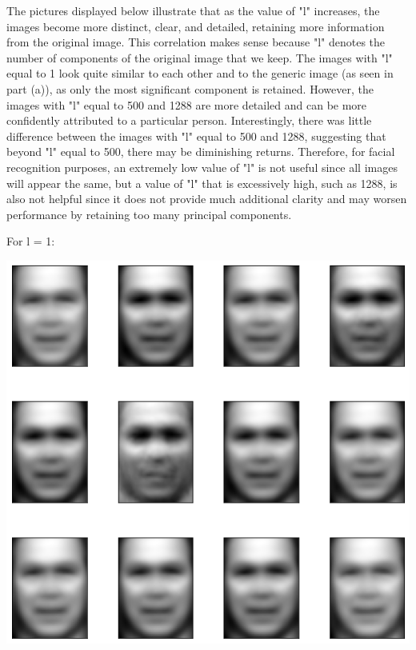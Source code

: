 \documentclass[11pt]{article}
\begin{document}
The pictures displayed below illustrate that as the value of "l" increases, the images become more distinct, clear, and detailed, retaining more information from the original image. This correlation makes sense because "l" denotes the number of components of the original image that we keep. The images with "l" equal to 1 look quite similar to each other and to the generic image (as seen in part (a)), as only the most significant component is retained. However, the images with "l" equal to 500 and 1288 are more detailed and can be more confidently attributed to a particular person. Interestingly, there was little difference between the images with "l" equal to 500 and 1288, suggesting that beyond "l" equal to 500, there may be diminishing returns. Therefore, for facial recognition purposes, an extremely low value of "l" is not useful since all images will appear the same, but a value of "l" that is excessively high, such as 1288, is also not helpful since it does not provide much additional clarity and may worsen performance by retaining too many principal components.

For l = 1:
\begin{center}
    \includegraphics[scale=0.6]{1c-1.png}
\end{center}
\end{document}
